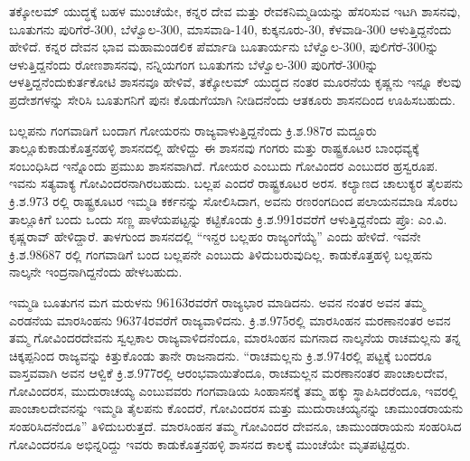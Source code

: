 ತಕ್ಕೋಲಮ್ ಯುದ್ಧಕ್ಕೆ ಬಹಳ ಮುಂಚೆಯೇ, ಕನ್ನರ ದೇವ ಮತ್ತು ರೇವಕನಿಮ್ಮಡಿಯನ್ನು ಹೆಸರಿಸುವ ಇಟಗಿ ಶಾಸನವು, ಬೂತುಗನು ಪುರಿಗೆರೆ-300, ಬೆಳ್ವೊಲ-300, ಮಾಸವಾಡಿ-140, ಕುಕ್ಕನೂರು-30, ಕೆಳವಾಡಿ-300 ಆಳುತ್ತಿದ್ದನೆಂದು ಹೇಳಿದೆ. ಕನ್ನರ ದೇವನ ಭಾವ ಮಹಾಮಂಡಲಿಕ ಪೆರ್ಮಾಡಿ ಬೂತಾರ್ಯನು ಬೆಳ್ವೊಲ-300, ಪುಲಿಗೆರೆ-300ನ್ನು ಆಳುತ್ತಿದ್ದನೆಂದು ರೋಣಶಾಸನವು, ನನ್ನಿಯಗಂಗ ಬೂತುಗನು ಬೆಳ್ವೊಲ-300 ಪುರಿಗೆರೆ-300ನ್ನು ಆಳತ್ತಿದ್ದನೆಂದು\break ಕುರ್ತಕೋಟಿ ಶಾಸನವೂ ಹೇಳಿವೆ, ತಕ್ಕೋಲಮ್ ಯುದ್ಧದ ನಂತರ ಮೂರನೆಯ ಕೃಷ್ಣನು ಇನ್ನೂ ಕೆಲವು ಪ್ರದೇಶಗಳನ್ನು ಸೇರಿಸಿ ಬೂತುಗನಿಗೆ ಪುನಃ ಕೊಡುಗೆಯಾಗಿ ನೀಡಿದನೆಂದು ಆತಕೂರು ಶಾಸನದಿಂದ ಊಹಿಸಬಹುದು.

ಬಲ್ಲಪನು ಗಂಗವಾಡಿಗೆ ಬಂದಾಗ ಗೋಯರನು ರಾಜ್ಯವಾಳುತ್ತಿದ್ದನೆಂದು ಕ್ರಿ.ಶ.987ರ ಮದ್ದೂರು ತಾಲ್ಲೂಕು\break ಕಾಡುಕೊತ್ತನಹಳ್ಳಿ ಶಾಸನದಲ್ಲಿ ಹೇಳಿದ್ದು ಈ ಶಾಸನವು ಗಂಗರು ಮತ್ತು ರಾಷ್ಟ್ರಕೂಟರ ಬಾಂಧವ್ಯಕ್ಕೆ ಸಂಬಂಧಿಸಿದ ಇನ್ನೊಂದು ಪ್ರಮುಖ ಶಾಸನವಾಗಿದೆ. ಗೋಯರ ಎಂಬುದು ಗೋವಿಂದರ ಎಂಬುದರ ಹ್ರಸ್ವರೂಪ. ಇವನು ಸತ್ಯವಾಕ್ಯ ಗೋವಿಂದರನಾಗಿರಬಹುದು. ಬಲ್ಲಪ ಎಂದರೆ ರಾಷ್ಟ್ರಕೂಟರ ಅರಸ. ಕಲ್ಯಾಣದ ಚಾಲುಕ್ಯರ ತೈಲಪನು ಕ್ರಿ.ಶ.973 ರಲ್ಲಿ ರಾಷ್ಟ್ರಕೂಟರ ಇಮ್ಮಡಿ ಕರ್ಕನನ್ನು ಸೋಲಿಸಿದಾಗ, ಅವನು ರಣರಂಗದಿಂದ ಪಲಾಯನಮಾಡಿ ಸೊರಬ ತಾಲ್ಲೂಕಿಗೆ ಬಂದು ಒಂದು ಸಣ್ಣ ಪಾಳೆಯಪಟ್ಟನ್ನು ಕಟ್ಟಿಕೊಂಡು ಕ್ರಿ.ಶ.991ರವರೆಗೆ ಆಳುತ್ತಿದ್ದನೆಂದು ಪ್ರೊ: ಎಂ.ವಿ. ಕೃಷ್ಣರಾವ್​ ಹೇಳಿದ್ದಾರೆ. ತಾಳಗುಂದ ಶಾಸನದಲ್ಲಿ “ಇನ್ದರ ಬಲ್ಲಹಂ ರಾಜ್ಯಂಗೆಯ್ಯೆ” ಎಂದು ಹೇಳಿದೆ. ಇವನೇ ಕ್ರಿ.ಶ.986\enginline{-}87 ರಲ್ಲಿ ಗಂಗವಾಡಿಗೆ ಬಂದ ಬಲ್ಲಪನೇ ಎಂಬುದು ತಿಳಿದುಬರುವುದಿಲ್ಲ. ಕಾಡುಕೊತ್ತಹಳ್ಳಿ ಬಲ್ಲಹನು ನಾಲ್ಕನೇ ಇಂದ್ರನಾಗಿದ್ದನೆಂದು ಹೇಳಬಹುದು.

ಇಮ್ಮಡಿ ಬೂತುಗನ ಮಗ ಮರುಳನು 961\enginline{-}63ರವರೆಗೆ ರಾಜ್ಯಭಾರ ಮಾಡಿದನು. ಅವನ ನಂತರ ಅವನ ತಮ್ಮ ಎರಡನೆಯ ಮಾರಸಿಂಹನು 963\enginline{-}74ರವರೆಗೆ ರಾಜ್ಯವಾಳಿದನು. ಕ್ರಿ.ಶ.975ರಲ್ಲಿ ಮಾರಸಿಂಹನ ಮರಣಾನಂತರ ಅವನ ತಮ್ಮ ಗೋವಿಂದರದೇವನು ಸ್ವಲ್ಪಕಾಲ ರಾಜ್ಯವಾಳಿದನೆಂದೂ, ಮಾರಸಿಂಹನ ಮಗನಾದ ನಾಲ್ಕನೆಯ ರಾಚಮಲ್ಲನು ತನ್ನ ಚಿಕ್ಕಪ್ಪನಿಂದ ರಾಜ್ಯವನ್ನು ಕಿತ್ತುಕೊಂಡು ತಾನೇ ರಾಜನಾದನು. “ರಾಚಮಲ್ಲನು ಕ್ರಿ.ಶ.974ರಲ್ಲಿ ಪಟ್ಟಕ್ಕೆ ಬಂದರೂ ವಾಸ್ತವವಾಗಿ ಅವನ ಆಳ್ವಿಕೆ ಕ್ರಿ.ಶ.977ರಲ್ಲಿ ಆರಂಭವಾಯಿತೆಂದೂ, ರಾಚಮಲ್ಲನ ಮರಣಾನಂತರ ಪಾಂಚಾಲದೇವ, ಗೋವಿಂದರಸ, ಮುದುರಾಚಯ್ಯ ಎಂಬುವವರು ಗಂಗವಾಡಿಯ ಸಿಂಹಾಸನಕ್ಕೆ ತಮ್ಮ ಹಕ್ಕು ಸ್ಥಾಪಿಸಿದರೆಂದೂ, ಇವರಲ್ಲಿ ಪಾಂಚಾಲದೇವನನ್ನು ಇಮ್ಮಡಿ ತೈಲಪನು ಕೊಂದರೆ, ಗೋವಿಂದರಸ ಮತ್ತು ಮುದುರಾಚಯ್ಯನನ್ನು ಚಾಮುಂಡರಾಯನು ಸಂಹರಿಸಿದನೆಂದೂ” ತಿಳಿದುಬರುತ್ತದೆ. ಮಾರಸಿಂಹನ ತಮ್ಮ ಗೋವಿಂದರ ದೇವನೂ, ಚಾಮುಂಡರಾಯನು ಸಂಹರಿಸಿದ ಗೋವಿಂದರನೂ ಅಭಿನ್ನರಿದ್ದು ಇವರು ಕಾಡುಕೊತ್ತನಹಳ್ಳಿ ಶಾಸನದ ಕಾಲಕ್ಕೆ ಮುಂಚೆಯೇ ಮೃತಪಟ್ಟಿದ್ದರು.



